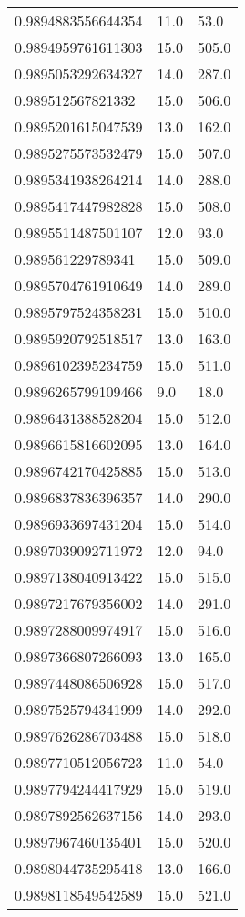 \begin{center}
\begin{supertabular}[H]{p{0.30\textwidth}p{0.05\textwidth}p{0.05\textwidth}}
0.9894883556644354 & 11.0 & 53.0 \\ 
0.9894959761611303 & 15.0 & 505.0 \\ 
0.9895053292634327 & 14.0 & 287.0 \\ 
0.989512567821332 & 15.0 & 506.0 \\ 
0.9895201615047539 & 13.0 & 162.0 \\ 
0.9895275573532479 & 15.0 & 507.0 \\ 
0.9895341938264214 & 14.0 & 288.0 \\ 
0.9895417447982828 & 15.0 & 508.0 \\ 
0.9895511487501107 & 12.0 & 93.0 \\ 
0.989561229789341 & 15.0 & 509.0 \\ 
0.9895704761910649 & 14.0 & 289.0 \\ 
0.9895797524358231 & 15.0 & 510.0 \\ 
0.9895920792518517 & 13.0 & 163.0 \\ 
0.9896102395234759 & 15.0 & 511.0 \\ 
0.9896265799109466 & 9.0 & 18.0 \\ 
0.9896431388528204 & 15.0 & 512.0 \\ 
0.9896615816602095 & 13.0 & 164.0 \\ 
0.9896742170425885 & 15.0 & 513.0 \\ 
0.9896837836396357 & 14.0 & 290.0 \\ 
0.9896933697431204 & 15.0 & 514.0 \\ 
0.9897039092711972 & 12.0 & 94.0 \\ 
0.9897138040913422 & 15.0 & 515.0 \\ 
0.9897217679356002 & 14.0 & 291.0 \\ 
0.9897288009974917 & 15.0 & 516.0 \\ 
0.9897366807266093 & 13.0 & 165.0 \\ 
0.9897448086506928 & 15.0 & 517.0 \\ 
0.9897525794341999 & 14.0 & 292.0 \\ 
0.9897626286703488 & 15.0 & 518.0 \\ 
0.9897710512056723 & 11.0 & 54.0 \\ 
0.9897794244417929 & 15.0 & 519.0 \\ 
0.9897892562637156 & 14.0 & 293.0 \\ 
0.9897967460135401 & 15.0 & 520.0 \\ 
0.9898044735295418 & 13.0 & 166.0 \\ 
0.9898118549542589 & 15.0 & 521.0 \\ 

\end{supertabular}
\end{center}
